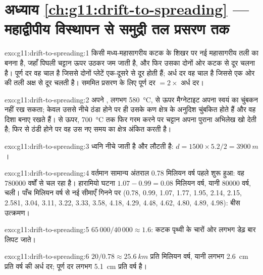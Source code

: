 \section*{अध्याय \ref{ch:g11:drift-to-spreading} --- महाद्वीपीय विस्थापन से समुद्री तल प्रसरण तक}

\begin{solution}{exo:g11:drift-to-spreading:1}
 किसी मध्य-महासागरीय कटक के शिखर पर नई महासागरीय तली का बनना है,
जहाँ पिघली चट्टान ऊपर उठकर जम जाती है, और फिर उसका दोनों ओर कटक से
दूर चलना है। पूर्ण दर वह चाल है जिससे दोनों प्लेटें एक-दूसरे से दूर होती हैं;
अर्ध दर वह चाल है जिससे एक ओर की तली अक्ष से दूर चलती है। सममित
प्रसरण के लिए पूर्ण दर $= 2
\times$ अर्ध दर।
\end{solution}

\begin{solution}{exo:g11:drift-to-spreading:2}
अपने , लगभग \qty{580}{\celsius}, से ऊपर मैग्नेटाइट अपना स्वयं का
चुंबकन नहीं रख सकता; केवल उससे नीचे ठंडा होने पर ही उसके कण क्षेत्र के अनुदिश
चुंबकित होते हैं और वह दिशा बनाए रखते हैं।  से ऊपर, \qty{700}{\celsius} तक
फिर गरम करने पर चट्टान अपना पुराना
अभिलेख खो देती है; फिर से ठंडी होने पर वह उस नए समय का क्षेत्र अंकित करती है।
\end{solution}

\begin{solution}{exo:g11:drift-to-spreading:3}
ध्वनि नीचे जाती है और लौटती है: $d = 1500 \times 5.2/2 = \qty{3900}{m}$।
\end{solution}

\begin{solution}{exo:g11:drift-to-spreading:4}
वर्तमान सामान्य अंतराल \num{0.78} मिलियन वर्ष पहले शुरू हुआ: वह
\num{780000} वर्षों से चल रहा है। हारामियो घटना $1.07 - 0.99 = \num{0.08}$
मिलियन वर्ष, यानी \num{80000} वर्ष, चली। पाँच मिलियन वर्ष से नई सीमाएँ
गिनने पर (0.78, 0.99, 1.07, 1.77, 1.95, 2.14, 2.15, 2.581, 3.04, 3.11,
3.22, 3.33, 3.58, 4.18, 4.29, 4.48, 4.62, 4.80, 4.89, 4.98): बीस उत्क्रमण।
\end{solution}

\begin{solution}{exo:g11:drift-to-spreading:5}
$65\,000/40\,000 \approx 1.6$: कटक पृथ्वी के चारों ओर लगभग डेढ़
बार लिपट जाते।
\end{solution}

\begin{solution}{exo:g11:drift-to-spreading:6}
$20/0.78 \approx \qty{25.6}{km}$ प्रति मिलियन वर्ष, यानी लगभग
\qty{2.6}{cm} प्रति वर्ष की अर्ध दर; पूर्ण दर लगभग \qty{5.1}{cm} प्रति वर्ष है।
\end{solution}

